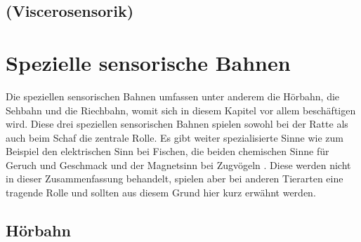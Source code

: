 \documentclass[12pt,a4paper,pdftex]{article}
\begin{document}
\subsection{(Viscerosensorik)}

\newpage
\section{Spezielle sensorische Bahnen}
\label{sec:spezsens}
Die speziellen sensorischen Bahnen umfassen unter anderem die Hörbahn, die Sehbahn und die Riechbahn, womit sich in diesem Kapitel vor allem beschäftigen wird. Diese drei speziellen sensorischen Bahnen spielen sowohl bei der Ratte als auch beim Schaf die zentrale Rolle. Es gibt weiter spezialisierte Sinne wie zum Beispiel den elektrischen Sinn bei Fischen, die beiden chemischen Sinne für Geruch und Geschmack und der Magnetsinn bei Zugvögeln \cite{smith2008biology}. Diese werden nicht in dieser Zusammenfassung behandelt, spielen aber bei anderen Tierarten eine tragende Rolle und sollten aus diesem Grund hier kurz erwähnt werden.

\subsection{Hörbahn}
\end{document}
